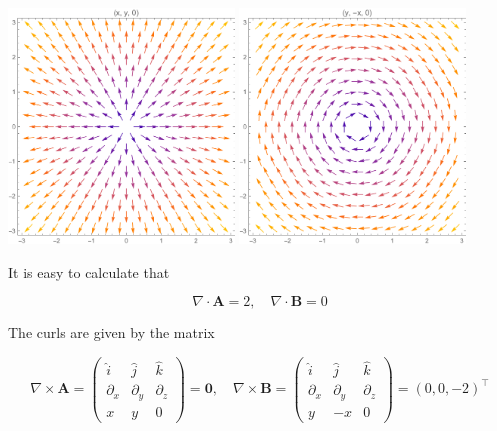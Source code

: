 \documentclass[12pt]{article}
\begin{document}
\begin{center}
    \includegraphics[width=0.45\textwidth]{../plots/VC_4_3_a.png}
    \includegraphics[width=0.45\textwidth]{../plots/VC_4_3_b.png}
\end{center}

It is easy to calculate that

\begin{equation}
    \nabla \cdot \mathbf{A} = 2, \quad \nabla \cdot \mathbf{B} = 0
\end{equation}

The curls are given by the matrix

\begin{equation}
    \nabla \times \mathbf{A} = 
    \begin{pmatrix}
        \hat{i} & \hat{j} & \hat{k} \\
        \partial_{x} & \partial_{y} & \partial_{z} \\
        x & y & 0
    \end{pmatrix}
    =
    \mathbf{0}, \quad
    \nabla \times \mathbf{B} =
    \begin{pmatrix}
        \hat{i} & \hat{j} & \hat{k} \\
        \partial_{x} & \partial_{y} & \partial_{z} \\
        y & -x & 0
    \end{pmatrix}
    =
    (0, 0, -2)^{\intercal}
\end{equation}
\end{document}
